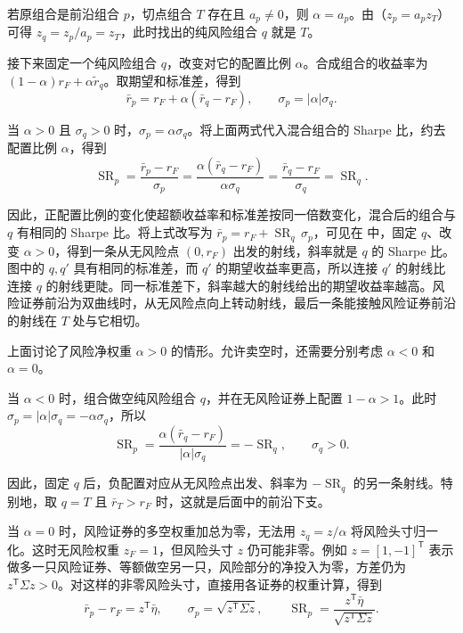 若原组合是前沿组合 $p$，切点组合 $T$ 存在且 $a_p\ne0$，则 $\alpha=a_p$。由（$z_p=a_pz_T$）可得 $z_q=z_p/a_p=z_T$，此时找出的纯风险组合 $q$ 就是 $T$。

接下来固定一个纯风险组合 $q$，改变对它的配置比例 $\alpha$。合成组合的收益率为 $(1-\alpha)r_F+\alpha\widetilde r_q$。取期望和标准差，得到
\[
 \bar r_p=r_F+\alpha(\bar r_q-r_F),\qquad \sigma_p=|\alpha|\sigma_q.
\]

当 $\alpha>0$ 且 $\sigma_q>0$ 时，$\sigma_p=\alpha\sigma_q$。将上面两式代入混合组合的 Sharpe 比，约去配置比例 $\alpha$，得到
\[
 \operatorname{SR}_p
 =\frac{\bar r_p-r_F}{\sigma_p}
 =\frac{\alpha(\bar r_q-r_F)}{\alpha\sigma_q}
 =\frac{\bar r_q-r_F}{\sigma_q}
 =\operatorname{SR}_q.
\]

因此，正配置比例的变化使超额收益率和标准差按同一倍数变化，混合后的组合与 $q$ 有相同的 Sharpe 比。将上式改写为 $\bar r_p=r_F+\operatorname{SR}_q\,\sigma_p$，可见在 中，固定 $q$、改变 $\alpha>0$，得到一条从无风险点 $(0,r_F)$ 出发的射线，斜率就是 $q$ 的 Sharpe 比。图中的 $q,q'$ 具有相同的标准差，而 $q'$ 的期望收益率更高，所以连接 $q'$ 的射线比连接 $q$ 的射线更陡。同一标准差下，斜率越大的射线给出的期望收益率越高。风险证券前沿为双曲线时，从无风险点向上转动射线，最后一条能接触风险证券前沿的射线在 $T$ 处与它相切。

\begin{center}
\begin{minipage}{\linewidth}
\centering
{}%
%
\end{minipage}
\end{center}

上面讨论了风险净权重 $\alpha>0$ 的情形。允许卖空时，还需要分别考虑 $\alpha<0$ 和 $\alpha=0$。

当 $\alpha<0$ 时，组合做空纯风险组合 $q$，并在无风险证券上配置 $1-\alpha>1$。此时 $\sigma_p=|\alpha|\sigma_q=-\alpha\sigma_q$，所以
\[
 \operatorname{SR}_p
 =\frac{\alpha(\bar r_q-r_F)}{|\alpha|\sigma_q}
 =-\operatorname{SR}_q,\qquad \sigma_q>0.
\]

因此，固定 $q$ 后，负配置对应从无风险点出发、斜率为 $-\operatorname{SR}_q$ 的另一条射线。特别地，取 $q=T$ 且 $\bar r_T>r_F$ 时，这就是后面中的前沿下支。



当 $\alpha=0$ 时，风险证券的多空权重加总为零，无法用 $z_q=z/\alpha$ 将风险头寸归一化。这时无风险权重 $z_F=1$，但风险头寸 $z$ 仍可能非零。例如 $z=[1,-1]^{\mathsf T}$ 表示做多一只风险证券、等额做空另一只，风险部分的净投入为零，方差仍为 $z^{\mathsf T}\Sigma z>0$。对这样的非零风险头寸，直接用各证券的权重计算，得到
\[
 \bar r_p-r_F=z^{\mathsf T}\bar\eta,\qquad
 \sigma_p=\sqrt{z^{\mathsf T}\Sigma z},\qquad
 \operatorname{SR}_p=\frac{z^{\mathsf T}\bar\eta}
                              {\sqrt{z^{\mathsf T}\Sigma z}}.
\]

